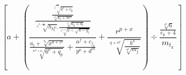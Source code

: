 \documentclass[11pt,a4paper]{beamer}
\begin{document}
\begin{frame}



  $$ \left[ a+ \left( \frac{\frac{\frac{\sqrt[{\sqrt[a^p]{m_j} }]{k^l+c_k}{}}{\sqrt[m^d]{k_l+m^n}}}{\sqrt[x^{d+\frac{m^n}{a_j}}]{h_{k_l^m}}.\frac{\sqrt[c^a]{k_q+d_l}}{\sqrt[a^{6+a}]{a\div\sqrt{6-y_l}}}}}{\frac{a_l+\sqrt[a_k]{x^{a+z^q}}}{\sqrt[m^3+a_l]{6^p+q_p}}+\frac{a^f+c_{j_k}}{y^p+d^m}}+\frac{r^{p+x}}{\sqrt[q+c^p]{\frac{b^3}{\sqrt[a^p]{m_j}}}} \right) \div \frac{\frac{\sqrt[a^k]{6}}{c_k+4}}{m_{t_k}} \right] $$  

\end{frame}
\end{document}
